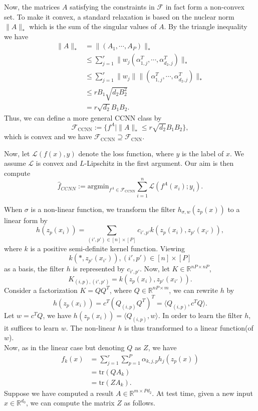 \documentclass{article}
\begin{document}
Now, the matrices $A$ satisfying the constraints in $\mathcal{F}$ in fact form a non-convex 	set. To make it convex, a standard relaxation is based on the nuclear norm $\|A\|_*$ which is the sum of the singular values of $A$. By the triangle inequality we have
\begin{align*}
\|A\|_*&=\|(A_1,\cdots,A_P)\|_*\\
&\leq\sum_{j=1}^r\|w_j(\alpha_{1,j}^T,\cdots,\alpha_{d_2,j}^T)\|_*\\
&\leq\sum_{j=1}^r\|w_j\|\|(\alpha_{1,j}^T,\cdots,\alpha_{d_2,j}^T)\|_*\\
&\leq rB_1\sqrt{d_2B_2^2}\\
&=r\sqrt{d_2}B_1B_2.
\end{align*}
Thus, we can define a more general CCNN class by
\[\mathcal{F}_{\text{CCNN}}:=\lbrace f^A|\|A\|_*\leq r\sqrt{d_2}B_1B_2\rbrace,\]
which is convex and we have $\mathcal{F}_{\text{CCNN}}\supseteq\mathcal{F}_{\text{CNN}}$.

Now, let $\mathcal{L}(f(x),y)$ denote the loss function, where $y$ is the label of $x$. We assume $\mathcal{L}$ is convex and $L$-Lipschitz in the first argument. Our aim is then compute
\[\widehat{f}_{CCNN}:=\text{argmin}_{f^A\in\mathcal{F}_{\text{CCNN}}}\sum_{i=1}^n\mathcal{L}(f^A(x_i);y_i).\]

When $\sigma$ is a non-linear function, we transform the filter $h_{\sigma,w}(z_p(x))$ to a linear form by
\[h(z_p(x_i))=\sum_{(i',p')\in[n]\times[P]}c_{i',p'}k(z_p(x_i),z_{p'}(x_{i'})),\]
where $k$ is a positive semi-definite kernel function. Viewing \[k(*,z_{p'}(x_{i'})),(i',p')\in[n]\times[P]\] as a basis, the filter $h$ is represented by $c_{i',p'}$. Now, let $K\in\mathbb{R}^{nP\times nP}$,
\[K_{(i,p),(i',p')}=k(z_p(x_i),z_{p'}(x_{i'})).\]
Consider a factorization $K=QQ^T$, where $Q\in\mathbb{R}^{nP\times m}$, we can rewrite $h$ by 
\[h(z_p(x_i))=c^T(Q_{(i,p)}Q^T)^T=\langle Q_{(i,p)},c^TQ\rangle.\]
Let $w=c^TQ$, we have $h(z_p(x_i))=\langle Q_{(i,p)},w\rangle$. In order to learn the filter $h$, it suffices to learn $w$. The non-linear $h$ is thus transformed to a linear function(of $w$).\\
Now, as in the linear case but denoting $Q$ as $Z$, we have
\begin{align*}
f_k(x)&=\sum_{j=1}^{r}\sum_{p=1}^{P}\alpha_{k,j,p}h_j(z_p(x))\\
&=\text{tr}(QA_k)\\
&=\text{tr}(ZA_k).
\end{align*}
Suppose we have computed a result $A\in\mathbb{R}^{m\times Pd_2}$. At test time, given a new input $x\in\mathbb{R}^{d_0}$, we can compute the matrix $Z$ as follows.
\end{document}

